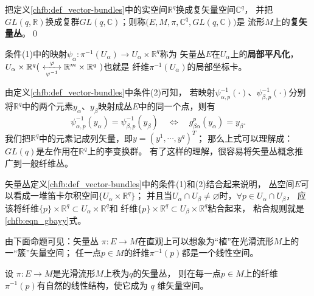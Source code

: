 \begin{definition}
把定义\ref{chfb:def_vector-bundles}中的实空间$\mathbb{R}^q$换成{\kaishu 复}矢量空间$\mathbb{C}^q$，
并把$GL(q,\mathbb{R})$换成复群$GL(q,\mathbb{C})$；则称$\bigl(E,M,\pi,\mathbb{C}^q,GL(q,\mathbb{C})\bigr)$是
流形$M$上的\textbf{复矢量丛}。\qed
\end{definition}

     

条件(1)中的映射$\psi_\alpha:\pi^{-1}(U_\alpha) \to U_\alpha \times \mathbb{R}^q$称为
矢量丛$E$在$U_\alpha$上的\textbf{局部平凡化}，
$U_\alpha \times \mathbb{R}^q (\ \xleftrightarrow[\varphi^{-1}]{\varphi} 
\mathbb{R}^m \times \mathbb{R}^q\ )$也就是
纤维$\pi^{-1}(U_\alpha)$的局部坐标卡。 




由定义\ref{chfb:def_vector-bundles}中条件(2)可知，
若映射$\psi^{-1}_{\alpha,p}(\cdot)$、$\psi^{-1}_{\beta,p}(\cdot)$分别
将$\mathbb{R}^q$中的两个元素$y_\alpha$、$y_\beta$映射成丛$E$中的同一个点，则有
\begin{equation}\label{chfb:eqn_gbayy}
    \psi^{-1}_{\alpha,p}(y_\alpha) = \psi^{-1}_{\beta,p}(y_\beta)
    \quad \Leftrightarrow \quad
    g^p_{\beta \alpha}(y_\alpha) = y_\beta .
\end{equation}
我们把$\mathbb{R}^q$中的元素记成列矢量，即$y=(y^1,\cdots, y^q)^T$；
那么上式可以理解成：$GL(q)$是左作用在$\mathbb{R}^q$上的李变换群。
有了这样的理解，很容易将矢量丛概念推广到一般纤维丛。



矢量丛定义\ref{chfb:def_vector-bundles}中的条件(1)和(2)结合起来说明，
丛空间$E$可以看成一堆笛卡尔积空间$\{U_\alpha \times \mathbb{R}^q\}$；
并且当$U_\alpha \cap U_\beta \neq \varnothing$时，$\forall p\in U_\alpha \cap U_\beta$，
应该将纤维$\{p\}\times \mathbb{R}^q \subset U_\alpha \times \mathbb{R}^q$和
纤维$\{p\}\times \mathbb{R}^q \subset U_\beta \times \mathbb{R}^q$粘合起来，
粘合规则就是\eqref{chfb:eqn_gbayy}式。

由下面命题可见：矢量丛 $\pi: E \to M$在直观上可以想象为“植”在光滑流形$M$上的一“簇”矢量空间；
任一点$p\in M$的纤维$\pi^{-1}(p)$都是一个线性空间。

\begin{proposition}\label{chfb:thm_linear-space}
设 $\pi: E \rightarrow M$是光滑流形$M$上秩为$q$的矢量丛，
则在每一点$p \in M$上的纤维 $\pi^{-1}(p)$有自然的线性结构，使它成为 $q$ 维矢量空间。
\end{proposition}

